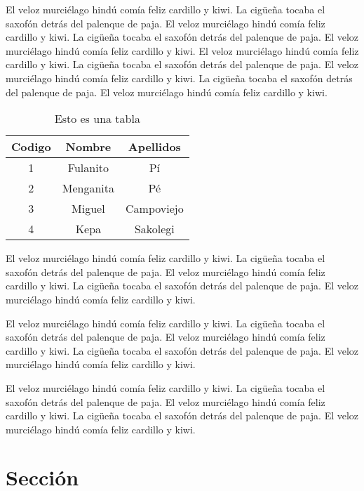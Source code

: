 El veloz murciélago hindú comía feliz cardillo y kiwi.  La cigüeña tocaba el saxofón detrás del palenque de paja.  El veloz murciélago hindú comía feliz cardillo y kiwi.  La cigüeña tocaba el saxofón detrás del palenque de paja.  El veloz murciélago hindú comía feliz cardillo y kiwi. El veloz murciélago hindú comía feliz cardillo y kiwi.  La cigüeña tocaba el saxofón detrás del palenque de paja.  El veloz murciélago hindú comía feliz cardillo y kiwi.  La cigüeña tocaba el saxofón detrás del palenque de paja.  El veloz murciélago hindú comía feliz cardillo y kiwi.


\begin{table}
\begin{center}
\begin{tabular}{|c|c|c|}
\hline Codigo & Nombre & Apellidos \\ 
\hline\hline 1 & Fulanito & Pí \\ 
\hline 2 & Menganita & Pé \\ 
\hline 3 & Miguel & Campoviejo \\ 
\hline 4 & Kepa & Sakolegi \\ 
\hline 
\end{tabular} 
\caption{Esto es una tabla}
\label{tbTabla2}
\end{center}
\end{table}

El veloz murciélago hindú comía feliz cardillo y kiwi.  La cigüeña tocaba el saxofón detrás del palenque de paja.  El veloz murciélago hindú comía feliz cardillo y kiwi.  La cigüeña tocaba el saxofón detrás del palenque de paja.  El veloz murciélago hindú comía feliz cardillo y kiwi.

El veloz murciélago hindú comía feliz cardillo y kiwi.  La cigüeña tocaba el saxofón detrás del palenque de paja.  El veloz murciélago hindú comía feliz cardillo y kiwi.  La cigüeña tocaba el saxofón detrás del palenque de paja.  El veloz murciélago hindú comía feliz cardillo y kiwi.


El veloz murciélago hindú comía feliz cardillo y kiwi.  La cigüeña tocaba el saxofón detrás del palenque de paja.  El veloz murciélago hindú comía feliz cardillo y kiwi.  La cigüeña tocaba el saxofón detrás del palenque de paja.  El veloz murciélago hindú comía feliz cardillo y kiwi.

\section{Sección} 

